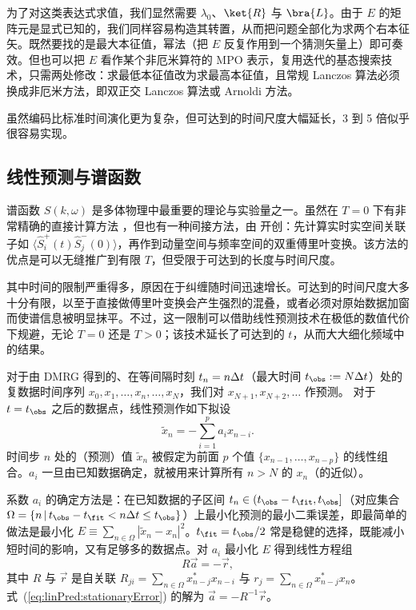 为了对这类表达式求值，我们显然需要 $\lambda_0$、$\ket{R}$ 与 $\bra{L}$。由于 $E$ 的矩阵元是显式已知的，我们同样容易构造其转置，从而把问题全部化为求两个右本征矢。既然要找的是最大本征值，幂法（把 $E$ 反复作用到一个猜测矢量上）即可奏效。但也可以把 $E$ 看作某个非厄米算符的 MPO 表示，复用迭代的基态搜索技术，只需两处修改：求最低本征值改为求最高本征值，且常规 Lanczos 算法必须换成非厄米方法，即双正交 Lanczos 算法或 Arnoldi 方法。

虽然编码比标准时间演化更为复杂，但可达到的时间尺度大幅延长，3 到 5 倍似乎很容易实现。
  
\subsection{线性预测与谱函数}
谱函数 $S(k,\omega)$ 是多体物理中最重要的理论与实验量之一。虽然在 $T=0$ 下有非常精确的直接计算方法 \cite{Hallberg95,Ramasesha97,Kuhner99,Jeckelmann02}，但也有一种间接方法，由 \cite{WhiteFeiguin04} 开创：先计算实时实空间关联子如 $\langle \hat{S}^+_i(t) \hat{S}^-_j(0) \rangle$，再作到动量空间与频率空间的双重傅里叶变换。该方法的优点是可以无缝推广到有限 $T$，但受限于可达到的长度与时间尺度。

其中时间的限制严重得多，原因在于纠缠随时间迅速增长。可达到的时间尺度大多十分有限，以至于直接做傅里叶变换会产生强烈的混叠，或者必须对原始数据加窗而使谱信息被明显抹平。不过，这一限制可以借助线性预测技术在极低的数值代价下规避，无论 $T=0$\cite{Pereira08,White08} 还是 $T>0$\cite{Barthel09b}；该技术延长了可达到的 $t$，从而大大细化频域中的结果。

对于由 DMRG 得到的、在等间隔时刻 $t_n=n\*\Delta t$（最大时间 $t_\obs:= N \Delta t$）处的复数据时间序列 $x_0, x_1, \ldots, x_n, \ldots, x_N$，我们对 $x_{N+1}, x_{N+2}, \ldots$ 作预测。
对于 $t=t_\obs$ 之后的数据点，线性预测作如下拟设
\begin{equation}\label{eq:predictionAnsatz}
\tilde{x}_n = - \sum_{i=1}^p a_i x_{n-i} .
\end{equation}
时间步 $n$ 处的（预测）值 $\tilde{x}_n$ 被假定为前面 $p$ 个值 $\{x_{n-1},\dots,x_{n-p}\}$ 的线性组合。$a_i$ 一旦由已知数据确定，就被用来计算所有 $n>N$ 的 $x_n$（的近似）。

系数 $a_i$ 的确定方法是：在已知数据的子区间 $t_n \in (t_\obs-t_\fit,t_\obs]$（对应集合 $\Omega = \{ n\, |\, t_\obs - t_\fit < n\Delta t \leq t_\obs \}$）上最小化预测的最小二乘误差，即最简单的做法是最小化 $E\equiv\sum_{n\in\Omega} |\tilde x_n-x_n|^2$。$t_\fit=t_\obs/2$ 常是稳健的选择，既能减小短时间的影响，又有足够多的数据点。对 $a_i$ 最小化 $E$ 得到线性方程组
\begin{equation}
\label{eq:linPred:stationaryError}
R \vec{a} = -\vec{r},
\end{equation}
其中 $R$ 与 $\vec{r}$ 是自关联
$R_{ji} = \sum_{n\in\Omega} x^*_{n-j} x_{n-i}$ 与 $r_{j} = \sum_{n\in\Omega} x^*_{n-j} x_n$。
式~(\ref{eq:linPred:stationaryError}) 的解为 $\vec{a}=-R^{-1}\vec{r}$。


